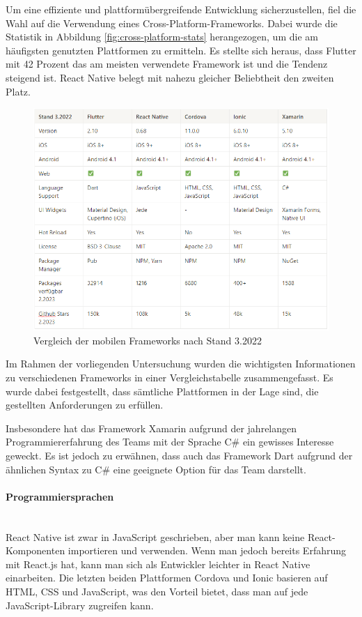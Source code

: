 Um eine effiziente und plattformübergreifende Entwicklung sicherzustellen, fiel die Wahl auf die Verwendung eines Cross-Platform-Frameworks. Dabei wurde die Statistik in Abbildung \ref{fig:cross-platform-stats} herangezogen, um die am häufigsten genutzten Plattformen zu ermitteln. Es stellte sich heraus, dass Flutter mit 42 Prozent das am meisten verwendete Framework ist und die Tendenz steigend ist. React Native belegt mit nahezu gleicher Beliebtheit den zweiten Platz.

\begin{figure}[h]
    \centering
    \includegraphics[width=1\textwidth]{pics/framework-comp.png}
    \caption{Vergleich der mobilen Frameworks nach Stand 3.2022 \cite{flutter, react-native, cordova, ionic, xamarin}}
    \label{fig:framework-comp}
\end{figure}

Im Rahmen der vorliegenden Untersuchung wurden die wichtigsten Informationen zu verschiedenen Frameworks in einer Vergleichstabelle zusammengefasst. Es wurde dabei festgestellt, dass sämtliche Plattformen in der Lage sind, die gestellten Anforderungen zu erfüllen.

Insbesondere hat das Framework Xamarin aufgrund der jahrelangen Programmiererfahrung des Teams mit der Sprache C\# ein gewisses Interesse geweckt. Es ist jedoch zu erwähnen, dass auch das Framework Dart aufgrund der ähnlichen Syntax zu C\# eine geeignete Option für das Team darstellt.

\paragraph{Programmiersprachen}\mbox{} \\
React Native ist zwar in JavaScript geschrieben, aber man kann keine React-Komponenten importieren und verwenden. Wenn man jedoch bereits Erfahrung mit React.js hat, kann man sich als Entwickler leichter in React Native einarbeiten. Die letzten beiden Plattformen Cordova und Ionic basieren auf HTML, CSS und JavaScript, was den Vorteil bietet, dass man auf jede JavaScript-Library zugreifen kann.


